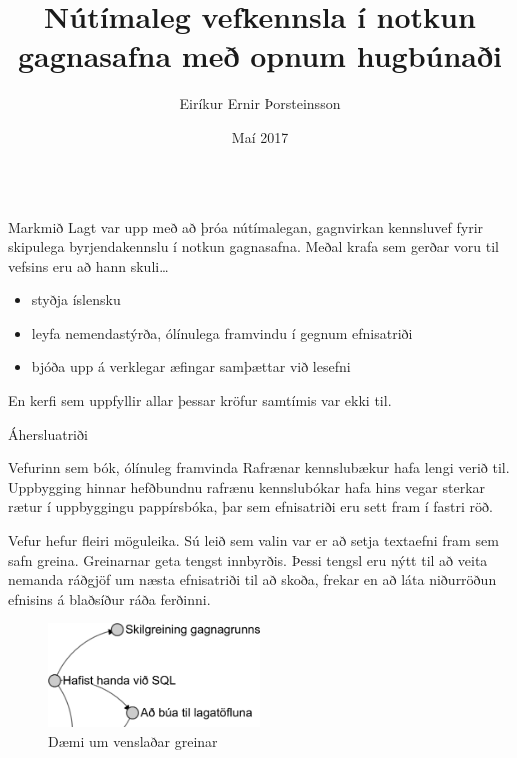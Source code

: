 \documentclass[final]{beamer}
\title{Nútímaleg vefkennsla í notkun gagnasafna með opnum hugbúnaði}
\author{Eiríkur Ernir Þorsteinsson}
\institute{Iðnaðarverkfræði-, vélaverkfræði- og tölvunarfræðideild}
\date{Maí 2017}
\begin{document}
\begin{frame}
\begin{tcolorbox}[standard jigsaw, height=97cm, colframe=orange, opacityback=0, sharp corners=all]
\begin{columns}[t]

\begin{column}{.47\linewidth}

\begin{block}{Markmið}
    Lagt var upp með að þróa nútímalegan, gagnvirkan kennsluvef fyrir skipulega byrjendakennslu í notkun gagnasafna. Meðal krafa sem gerðar voru til vefsins eru að hann skuli\ldots
    \begin{itemize}
        \item styðja íslensku
        \item leyfa nemendastýrða, ólínulega framvindu í gegnum efnisatriði
        \item bjóða upp á verklegar æfingar samþættar við lesefni
    \end{itemize}
    En kerfi sem uppfyllir allar þessar kröfur samtímis var ekki til.
\end{block}

\begin{block}{Áhersluatriði}

    \begin{subblock}{Vefurinn sem bók, ólínuleg framvinda} 
        Rafrænar kennslubækur hafa lengi verið til. Uppbygging hinnar hefðbundnu rafrænu kennslubókar hafa hins vegar sterkar rætur í uppbyggingu pappírsbóka, þar sem efnisatriði eru sett fram í fastri röð.

        Vefur hefur fleiri möguleika. Sú leið sem valin var er að setja textaefni fram sem safn greina. 
        Greinarnar geta tengst innbyrðis. Þessi tengsl eru nýtt til að veita nemanda ráðgjöf um næsta efnisatriði til að skoða, frekar en að láta niðurröðun efnisins á blaðsíður ráða ferðinni.
        \begin{figure}
            \caption{Dæmi um venslaðar greinar}
            \includegraphics[width=0.5\textwidth]{relational-sections}
        \end{figure}
    \end{subblock}


\end{block}
\end{column}
\end{columns}
\end{tcolorbox}
\end{frame}
\end{document}
